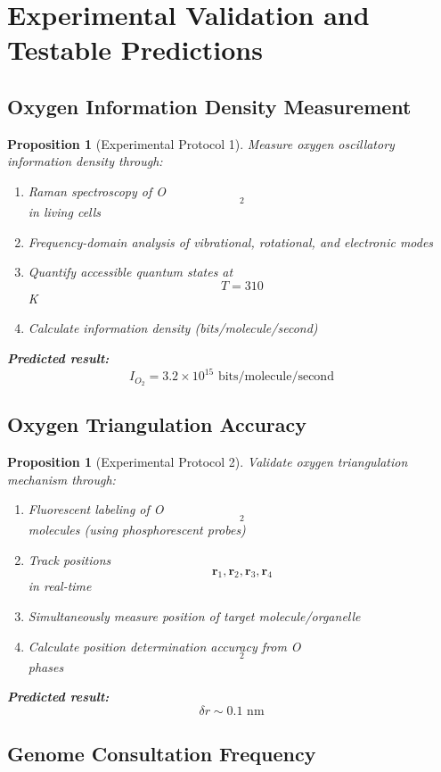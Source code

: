 \documentclass[12pt,a4paper]{article}
\newtheorem{proposition}[theorem]{Proposition}
\begin{document}
\section{Experimental Validation and Testable Predictions}

\subsection{Oxygen Information Density Measurement}

\begin{proposition}[Experimental Protocol 1]
Measure oxygen oscillatory information density through:
\begin{enumerate}
\item Raman spectroscopy of O$$_2$$ in living cells
\item Frequency-domain analysis of vibrational, rotational, and electronic modes
\item Quantify accessible quantum states at $$T = 310$$ K
\item Calculate information density (bits/molecule/second)
\end{enumerate}

\textbf{Predicted result:}
$$
I_{O_2} = 3.2 \times 10^{15} \text{ bits/molecule/second}
$$
\end{proposition}

\subsection{Oxygen Triangulation Accuracy}

\begin{proposition}[Experimental Protocol 2]
Validate oxygen triangulation mechanism through:
\begin{enumerate}
\item Fluorescent labeling of O$$_2$$ molecules (using phosphorescent probes)
\item Track positions $$\mathbf{r}_1, \mathbf{r}_2, \mathbf{r}_3, \mathbf{r}_4$$ in real-time
\item Simultaneously measure position of target molecule/organelle
\item Calculate position determination accuracy from O$$_2$$ phases
\end{enumerate}

\textbf{Predicted result:}
$$
\delta r \sim 0.1 \text{ nm}
$$
\end{proposition}

\subsection{Genome Consultation Frequency}
\end{document}
